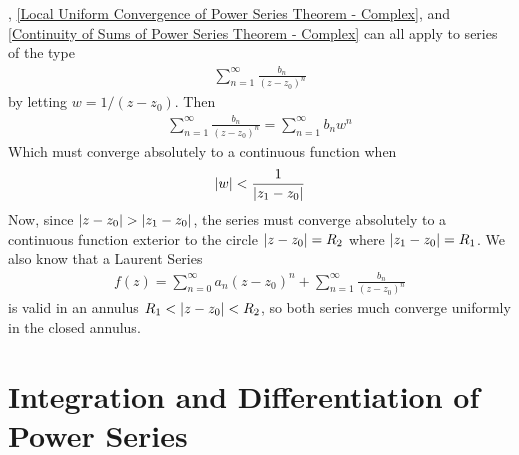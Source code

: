 \documentclass[12pt, english]{book}
\begin{document}
	, \cref{Local Uniform Convergence of Power Series Theorem - Complex}, and \cref{Continuity of Sums of Power Series Theorem - Complex} can all apply to series of the type
	\begin{align*}
		\sum_{n=1}^{\infty} \frac{b_n}{(z-z_0)^n}
	\end{align*}
	by letting \(w = 1/(z-z_0)\). Then 
	\begin{align*}
		\sum_{n=1}^{\infty} \frac{b_n}{(z-z_0)^n} = \sum_{n=1}^{\infty} b_n w^n
	\end{align*}
	Which must converge absolutely to a continuous function when 
	\begin{align*}
		\abs{w} < \frac{1}{\abs{z_1 - z_0}}
	\end{align*}
	Now, since \(\abs{z-z_0}> \abs{z_1 - z_0}\), the series must converge absolutely to a continuous function exterior to the circle \(\abs{z-z_0} = R_2\) where \(\abs{z_1 - z_0} = R_1\). We also know that a Laurent Series
	\begin{align*}
		f(z) = \sum_{n=0}^{\infty} a_n (z-z_0)^n + \sum_{n=1}^{\infty} \frac{b_n}{(z-z_0)^n}
	\end{align*}
	is valid in an annulus \(R_1 < \abs{z-z_0} < R_2\), so both series much converge uniformly in the closed annulus. 
	
	\section{Integration and Differentiation of Power Series} \label{Integration and Differentiation of Power Series Section - Complex}
	
\end{document}
